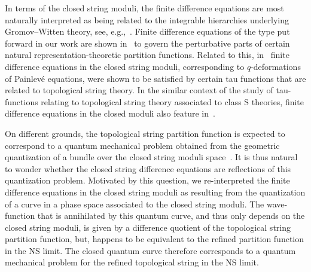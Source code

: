 \documentclass[pdftex]{sigma}
\numberwithin{equation}{section}
\begin{document}
In terms of the closed string moduli, the finite difference equations are most naturally interpreted as being related to the integrable hierarchies underlying Gromov--Witten theory, see, e.g.,~\cite{Pandharipande:2000}. Finite difference equations of the type put forward in our work are shown in~\cite{NO} to govern the perturbative parts of certain natural representation-theoretic partition functions. Related to this, in~\cite{BGT} finite difference equations in the closed string moduli, corresponding to $q$-deformations of Painlev\'e equations, were shown to be satisfied by certain tau functions that are related to topological string theory. In the similar context of the study of tau-functions relating to topological string theory associated to class S theories, finite difference equations in the closed moduli also feature in~\cite{CLT20}.

On different grounds, the topological string partition function is expected to correspond to a quantum mechanical problem obtained from the geometric quantization of a bundle over the closed string moduli space~\cite{Witten:1993ed}. It is thus natural to wonder whether the closed string difference equations are reflections of this quantization problem. Motivated by this question, we re-interpreted the finite difference equations in the closed string moduli as resulting from the quantization of a curve in a phase space associated to the closed string moduli. The wave-function that is annihilated by this quantum curve, and thus only depends on the closed string moduli, is given by a difference quotient of the topological string partition function, but, happens to be equivalent to the refined partition function in the NS limit. The closed quantum curve therefore corresponds to a quantum mechanical problem for the refined topological string in the NS limit.
\end{document}
